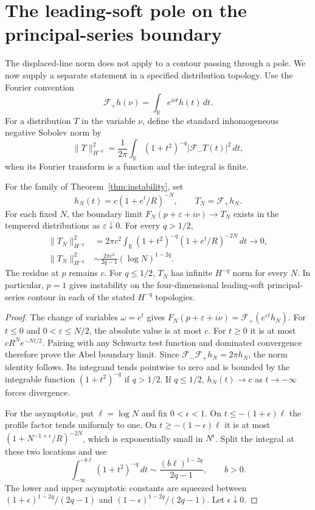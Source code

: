 \section{The leading-soft pole on the principal-series boundary}
\label{sec:boundary}
The displaced-line norm does not apply to a contour passing through a pole.
We now supply a separate statement in a specified distribution topology.
Use the Fourier convention
\[
 \mathcal F_+h(\nu)=\int_{\mathbb R}e^{i\nu t}h(t)\,dt.
\]
For a distribution $T$ in the variable $\nu$, define the standard inhomogeneous
negative Sobolev norm by
\[
 \|T\|_{H^{-q}}^2=\frac1{2\pi}\int_{\mathbb R}
 (1+t^2)^{-q}|\mathcal F_-T(t)|^2\,dt,
\]
when its Fourier transform is a function and the integral is finite.

\begin{theorem}\label{thm:boundary}
For the family of Theorem~\ref{thm:instability}, set
\[
 h_N(t)=c(1+e^t/R)^{-N},\qquad T_N=\mathcal F_+h_N.
\]
For each fixed $N$, the boundary limit
$F_N(p+\varepsilon+i\nu)\to T_N$ exists in the tempered distributions
as $\varepsilon\downarrow0$. For every $q>1/2$,
\begin{align}
 \|T_N\|_{H^{-q}}^2
 &=2\pi c^2\int_{\mathbb R}(1+t^2)^{-q}(1+e^t/R)^{-2N}\,dt
 \longrightarrow0,\label{eq:boundarynorm}\\
 \|T_N\|_{H^{-q}}^2
 &\sim \frac{2\pi c^2}{2q-1}(\log N)^{1-2q}.
 \label{eq:boundaryrate}
\end{align}
The residue at $p$ remains $c$. For $q\le1/2$, $T_N$ has infinite
$H^{-q}$ norm for every $N$. In particular, $p=1$ gives instability
on the four-dimensional leading-soft principal-series contour in each
of the stated $H^{-q}$ topologies.
\end{theorem}
\begin{proof}
The change of variables $\omega=e^t$ gives
$F_N(p+\varepsilon+i\nu)=\mathcal F_+(e^{\varepsilon t}h_N)$.
For $t\le0$ and $0<\varepsilon\le N/2$, the absolute value is at most $c$.
For $t\ge0$ it is at most $cR^Ne^{-Nt/2}$.
Pairing with any Schwartz test function and dominated convergence therefore
prove the Abel boundary limit. Since $\mathcal F_-\mathcal F_+h_N=2\pi h_N$,
the norm identity follows. Its integrand tends pointwise to zero and is
bounded by the integrable function $(1+t^2)^{-q}$ if $q>1/2$.
If $q\le1/2$, $h_N(t)\to c$ as $t\to-\infty$ forces divergence.

For the asymptotic, put $\ell=\log N$ and fix $0<\epsilon<1$.
On $t\le-(1+\epsilon)\ell$ the profile factor tends uniformly to one.
On $t\ge-(1-\epsilon)\ell$ it is at most
$(1+N^{-1+\epsilon}/R)^{-2N}$, which is exponentially small in $N^\epsilon$.
Split the integral at these two locations and use
\[
 \int_{-\infty}^{-b\ell}(1+t^2)^{-q}\,dt
 \sim \frac{(b\ell)^{1-2q}}{2q-1},\qquad b>0.
\]
The lower and upper asymptotic constants are squeezed between
$(1+\epsilon)^{1-2q}/(2q-1)$ and
$(1-\epsilon)^{1-2q}/(2q-1)$. Let $\epsilon\downarrow0$.
\end{proof}

